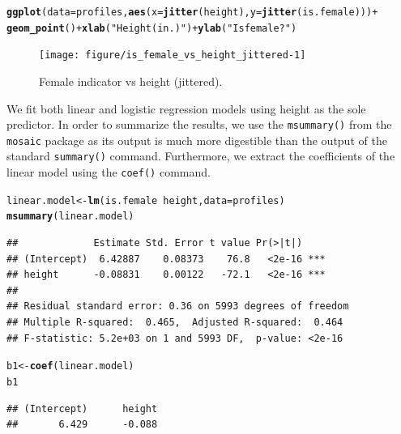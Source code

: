 \documentclass{article}\usepackage[]{graphicx}\usepackage[]{color}
\makeatletter
\newcommand{\hlstr}[1]{\textcolor[rgb]{0.192,0.494,0.8}{#1}}%
\newcommand{\hlopt}[1]{\textcolor[rgb]{0,0,0}{#1}}%
\newcommand{\hlstd}[1]{\textcolor[rgb]{0.345,0.345,0.345}{#1}}%
\newcommand{\hlkwb}[1]{\textcolor[rgb]{0.69,0.353,0.396}{#1}}%
\newcommand{\hlkwc}[1]{\textcolor[rgb]{0.333,0.667,0.333}{#1}}%
\newcommand{\hlkwd}[1]{\textcolor[rgb]{0.737,0.353,0.396}{\textbf{#1}}}%
\newenvironment{kframe}{%
 \def\at@end@of@kframe{}%
 \ifinner\ifhmode%
  \def\at@end@of@kframe{\end{minipage}}%
  \begin{minipage}{\columnwidth}%
 \fi\fi%
 \def\FrameCommand##1{\hskip\@totalleftmargin \hskip-\fboxsep
 \colorbox{shadecolor}{##1}\hskip-\fboxsep
     \hskip-\linewidth \hskip-\@totalleftmargin \hskip\columnwidth}%
 \MakeFramed {\advance\hsize-\width
   \@totalleftmargin\z@ \linewidth\hsize
   \@setminipage}}%
 {\par\unskip\endMakeFramed%
 \at@end@of@kframe}
\newenvironment{knitrout}{}{} %
\makeatother
\begin{document}
\begin{knitrout}
\color{fgcolor}\begin{kframe}
\begin{alltt}
\hlkwd{ggplot}\hlstd{(}\hlkwc{data}\hlstd{=profiles,} \hlkwd{aes}\hlstd{(}\hlkwc{x}\hlstd{=}\hlkwd{jitter}\hlstd{(height),} \hlkwc{y}\hlstd{=}\hlkwd{jitter}\hlstd{(is.female)))} \hlopt{+}
  \hlkwd{geom_point}\hlstd{()} \hlopt{+} \hlkwd{xlab}\hlstd{(}\hlstr{"Height (in.)"}\hlstd{)} \hlopt{+} \hlkwd{ylab}\hlstd{(}\hlstr{"Is female?"}\hlstd{)}
\end{alltt}
\end{kframe}\begin{figure}

{\centering \texttt{[image: figure/is\_female\_vs\_height\_jittered-1]} 

}

\caption[Female indicator vs height (jittered)]{Female indicator vs height (jittered).}\label{fig:is_female_vs_height_jittered}
\end{figure}


\end{knitrout}

We fit both linear and logistic regression models using height as the sole predictor.  In order to summarize the results, we use the \verb#msummary()# from the \verb#mosaic# package as its output is much more digestible than the output of the standard \verb#summary()# command.  Furthermore, we extract the coefficients of the linear model using the \verb#coef()# command.

\begin{knitrout}
\color{fgcolor}\begin{kframe}
\begin{alltt}
\hlstd{linear.model} \hlkwb{<-} \hlkwd{lm}\hlstd{(is.female} \hlopt{~} \hlstd{height,} \hlkwc{data}\hlstd{=profiles)}
\hlkwd{msummary}\hlstd{(linear.model)}
\end{alltt}
\begin{verbatim}
##             Estimate Std. Error t value Pr(>|t|)    
## (Intercept)  6.42887    0.08373    76.8   <2e-16 ***
## height      -0.08831    0.00122   -72.1   <2e-16 ***
## 
## Residual standard error: 0.36 on 5993 degrees of freedom
## Multiple R-squared:  0.465,	Adjusted R-squared:  0.464 
## F-statistic: 5.2e+03 on 1 and 5993 DF,  p-value: <2e-16
\end{verbatim}
\begin{alltt}
\hlstd{b1} \hlkwb{<-} \hlkwd{coef}\hlstd{(linear.model)}
\hlstd{b1}
\end{alltt}
\begin{verbatim}
## (Intercept)      height 
##       6.429      -0.088
\end{verbatim}
\end{kframe}
\end{knitrout}
\end{document}
